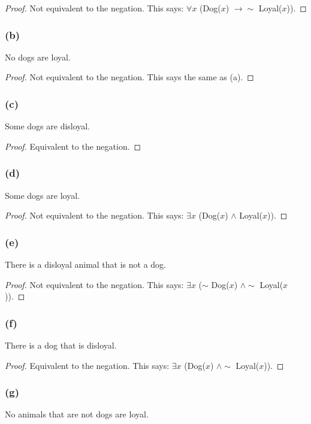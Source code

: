\documentclass[14pt]{extarticle}
\newcommand{\fa}{\forall}
\newcommand{\te}{\exists}
\begin{document}
\begin{proof}
Not equivalent to the negation. This says: $\fa x$ (Dog($x$) $\to\sim$ Loyal($x$)).
\end{proof}

\subsubsection{(b)}
No dogs are loyal.

\begin{proof}
Not equivalent to the negation. This says the same as (a).
\end{proof}

\subsubsection{(c)}
Some dogs are disloyal.

\begin{proof}
Equivalent to the negation.
\end{proof}

\subsubsection{(d)}
Some dogs are loyal.

\begin{proof}
Not equivalent to the negation. This says: $\te x$ (Dog($x$) $\wedge$ Loyal($x$)).
\end{proof}

\subsubsection{(e)}
There is a disloyal animal that is not a dog.

\begin{proof}
Not equivalent to the negation. This says: $\te x$ ($\sim$ Dog($x$) $\wedge\sim$ Loyal($x$)).
\end{proof}

\subsubsection{(f)}
There is a dog that is disloyal.

\begin{proof}
Equivalent to the negation. This says: $\te x$ (Dog($x$) $\wedge\sim$ Loyal($x$)).
\end{proof}

\subsubsection{(g)}
No animals that are not dogs are loyal.
\end{document}
